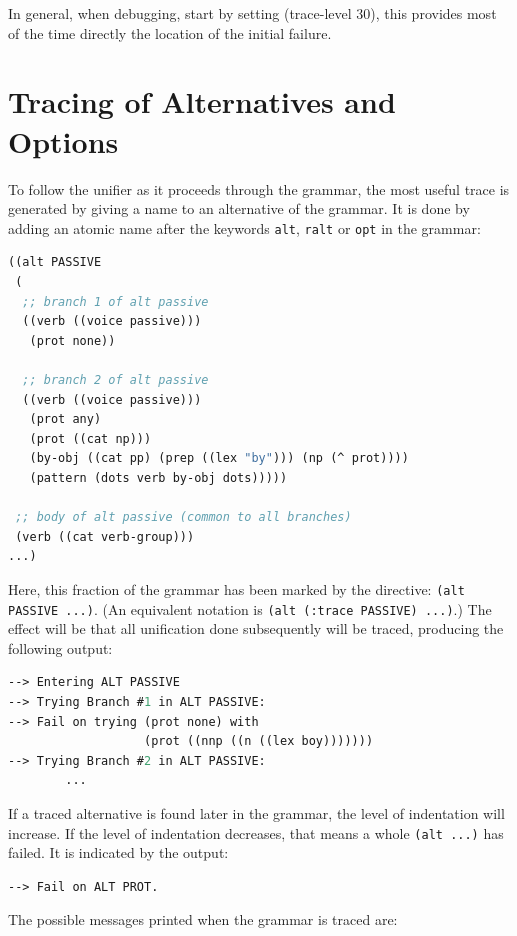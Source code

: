 \documentclass[10pt,a4paper]{report}
\begin{document}
In general, when debugging, start by setting (trace-level 30), this 
provides most of the time directly the location of the initial failure. 


\section{Tracing of Alternatives and Options}

To follow the unifier as it proceeds through the grammar, the most useful
trace is generated by giving a name to an alternative of the grammar. It is
done by adding an atomic name after the keywords {\tt alt}, {\tt ralt} or
{\tt opt} in the grammar:

\begin{lstlisting}[language=Lisp]
((alt PASSIVE
 (
  ;; branch 1 of alt passive
  ((verb ((voice passive)))
   (prot none))
  
  ;; branch 2 of alt passive
  ((verb ((voice passive)))
   (prot any)
   (prot ((cat np)))
   (by-obj ((cat pp) (prep ((lex "by"))) (np (^ prot))))
   (pattern (dots verb by-obj dots)))))

 ;; body of alt passive (common to all branches)
 (verb ((cat verb-group))) 
...)
\end{lstlisting}

Here, this fraction of the grammar has been marked by the
directive: {\tt (alt PASSIVE ...)}. (An equivalent notation is {\tt (alt
(:trace PASSIVE) ...)}.)  The effect will be that all
unification done subsequently will be traced, producing the
following output:

\begin{lstlisting}[language=Lisp]
--> Entering ALT PASSIVE
--> Trying Branch #1 in ALT PASSIVE:
--> Fail on trying (prot none) with 
				   (prot ((nnp ((n ((lex boy)))))))
--> Trying Branch #2 in ALT PASSIVE:
        ...
\end{lstlisting}

If a traced alternative is found later in the grammar, the level of
indentation will increase. If the level of indentation decreases,
that means a whole {\tt (alt ...)} has failed. It is indicated by the output:

\begin{lstlisting}
--> Fail on ALT PROT.
\end{lstlisting}

The possible messages printed when the grammar is traced are:
\end{document}
